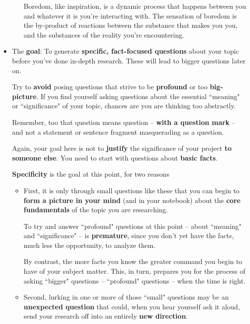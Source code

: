 \documentclass[11pt]{article}
\begin{document}
\begin{itemize}
\begin{itemize}
Boredom, like inspiration, is a dynamic process that happens between you and whatever it is you’re interacting with. The sensation of boredom is the by-product of reactions between the substance that makes you you, and the substances of the reality you’re encountering.
\end{itemize}


\item \begin{exercise}

The \textbf{goal}: To generate \textbf{specific, fact-focused questions} about your topic before you’ve done in-depth research. These will lead to bigger questions later on.

Try to \textbf{avoid} posing questions that strive to be \textbf{profound} or too \textbf{big-picture}. If you find yourself asking questions about the essential ``meaning" or ``significance" of your topic, chances are you are thinking too abstractly.

Remember, too that question means question -- \textbf{with a question mark} -- and not a statement or sentence fragment masquerading as a question.

Again, your goal here is not to \textbf{justify} the significance of your project \textbf{to someone else}. You need to start with questions about \textbf{basic facts}. 

\textbf{Specificity} is the goal at this point, for two reasons
\begin{itemize}
\item First, it is only through small questions like these that you can begin to \textbf{form a picture in your mind} (and in your notebook) about the \textbf{core fundamentals} of the topic you are researching. 

To try and answer ``profound" questions at this point -- about ``meaning" and ``significance" -- is \textbf{premature}, since you don’t yet have the facts, much less the opportunity, to analyze them.  

By contrast, the more facts you know the greater command you begin to have of your subject matter. This, in turn, prepares you for the process of asking ``bigger" questions -- ``profound" questions -- when the time is right.

\item Second, lurking in one or more of those ``small" questions may be an \textbf{unexpected question} that could, when you hear yourself ask it aloud, send your research off into an entirely \textbf{new direction}. 
\end{itemize}


\end{exercise}
\end{itemize}
\end{document}

